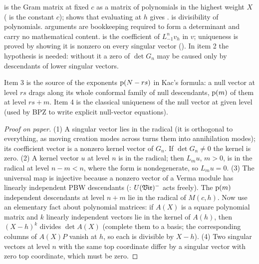 \begin{dictionary}
 is the Gram matrix at fixed $c$ as a matrix of polynomials in the
highest weight $X$ ( is the constant $c$); \allowbreak{}
shows that evaluating at $h$ gives .  is divisibility of polynomials.
\lean{[DecidableEq …]} arguments are bookkeeping required to form a determinant and carry no
mathematical content.  is the coefficient of $L_{-1}^nv_h$ in $v$;
uniqueness is proved by showing it is nonzero on every singular vector (\allowbreak{}\allowbreak{}\allowbreak{}\allowbreak{}).
In item 2 the hypothesis  is needed: without it a zero of $\det G_n$ may be caused only by
descendants of lower singular vectors.
\end{dictionary}

\begin{physics}
Item 3 is the source of the exponents $\mathrm{p}(N-rs)$ in Kac's formula: a null vector at level $rs$ drags
along its whole conformal family of null descendants, $\mathrm{p}(m)$ of them at level $rs+m$. Item 4 is the
classical uniqueness of the null vector at given level (used by BPZ to write explicit null-vector
equations).
\end{physics}

\begin{proof}[Proof on paper]
(1) A singular vector lies in the radical (it is orthogonal to everything, as moving creation modes across
turns them into annihilation modes); its coefficient vector is a nonzero kernel vector of $G_n$. If
$\det G_n\ne0$ the kernel is zero. (2) A kernel vector $u$ at level $n$ is in the radical; then $L_mu$,
$m>0$, is in the radical at level $n-m<n$, where the form is nondegenerate, so $L_mu = 0$. (3) The universal
map is injective because a nonzero vector of a Verma module has linearly independent PBW descendants
(\allowbreak{}: $U(\mathfrak{Vir})^-$ acts freely). The $\mathrm{p}(m)$ independent
descendants at level $n+m$ lie in the radical of $M(c,h)$. Now use an elementary fact about polynomial
matrices: if $A(X)$ is a square polynomial matrix and $k$ linearly independent vectors lie in the kernel
of $A(h)$, then $(X-h)^k$ divides $\det A(X)$ (complete them to a basis; the corresponding columns of
$A(X)P$ vanish at $h$, so each is divisible by $X-h$). (4) Two singular vectors at level $n$ with the same
top coordinate differ by a singular vector with zero top coordinate, which must be zero.
\end{proof}

